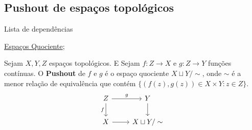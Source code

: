 \subsection{Pushout de espaços topológicos} %
\label{pushout-de-espacos-topologicos-def}
\begin{titlemize}{Lista de dependências}
	\item \hyperref[topologia-quociente-def]{Espaços Quociente};\\ %
\end{titlemize}

\begin{defi}
    Sejam $X,Y,Z$ espaços topológicos. E Sejam $f:Z\rightarrow X$ e $g:Z\rightarrow Y$ funções contínuas. O \textbf{Pushout} de $f$ e $g$ é o espaço quociente $X\sqcup Y/\sim$, onde $\sim$ é a menor relação de equivalência que contém $\{(f(z),g(z))\in X\times Y:z\in Z\}$.
\[\begin{tikzcd}
	Z & Y \\
	X & {X\sqcup Y/\sim}
	\arrow["g", from=1-1, to=1-2]
	\arrow["f"', from=1-1, to=2-1]
	\arrow[from=1-2, to=2-2]
	\arrow[from=2-1, to=2-2]
\end{tikzcd}\]
\end{defi}
